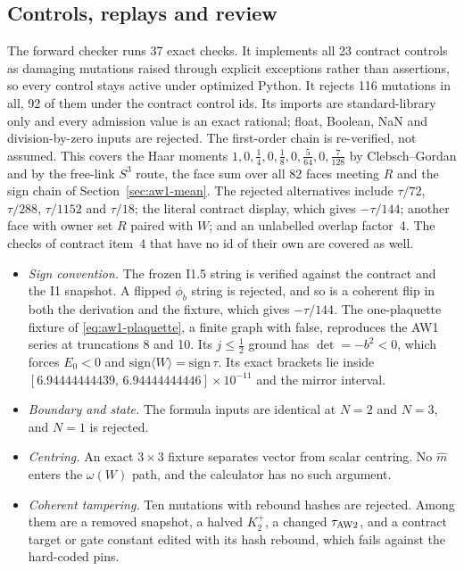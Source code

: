 \subsection{Controls, replays and review}
\label{sec:aw2-evidence}
The forward checker runs 37 exact checks. It implements all 23 contract
controls as damaging mutations raised through explicit exceptions rather than
assertions, so every control stays active under optimized Python. It rejects
116 mutations in all, 92 of them under the contract control ids. Its imports
are standard-library only and every admission value is an exact rational;
float, Boolean, NaN and division-by-zero inputs are rejected. The first-order
chain is re-verified, not assumed. This covers the Haar moments
$1,0,\tfrac14,0,\tfrac18,0,\tfrac5{64},0,\tfrac7{128}$ by Clebsch--Gordan and
by the free-link $S^3$ route, the face sum over all 82 faces meeting $R$ and
the sign chain of Section~\ref{sec:aw1-mean}. The rejected alternatives
include $\tau/72$, $\tau/288$, $\tau/1152$ and $\tau/18$; the literal contract
display, which gives $-\tau/144$; another face with owner set $R$ paired with
$W$; and an unlabelled overlap factor~4. The checks of contract item~4 that
have no id of their own are covered as well.
\begin{itemize}
\item \emph{Sign convention.} The frozen I1.5 string is verified against the
contract and the I1 snapshot. A flipped $\phi_b$ string is rejected, and so is
a coherent flip in both the derivation and the fixture, which gives
$-\tau/144$. The one-plaquette fixture of \eqref{eq:aw1-plaquette}, a finite
graph with  false, reproduces the AW1 series at
truncations 8 and 10. Its $j\le\tfrac12$ ground has $\det=-b^2<0$, which
forces $E_0<0$ and $\mathrm{sign}\langle W\rangle=\mathrm{sign}\,\tau$. Its
exact brackets lie inside $[6.94444444439,\,6.94444444446]\times10^{-11}$ and
the mirror interval.
\item \emph{Boundary and state.} The formula inputs are identical at $N=2$ and
$N=3$, and $N=1$ is rejected.
\item \emph{Centring.} An exact $3\times3$ fixture separates vector from scalar
centring. No $\hat m$ enters the $\omega(W)$ path, and the calculator has no
such argument.
\item \emph{Coherent tampering.} Ten mutations with rebound hashes are
rejected. Among them are a removed snapshot, a halved $K_2^+$, a changed
$\tau_{\rm AW2}$, and a contract target or gate constant edited with its hash
rebound, which fails against the hard-coded pins.
\end{itemize}
